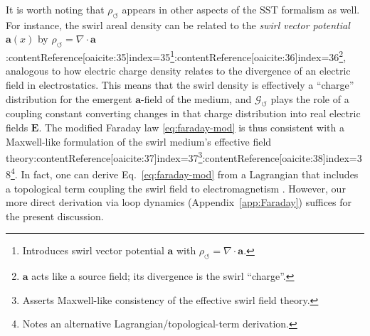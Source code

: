 \documentclass[12pt]{article}
\begin{document}
        It is worth noting that $\rho_{\!\boldsymbol{\circlearrowleft}}$ appears in other aspects of the SST formalism as well. For instance, the swirl areal density can be related to the \emph{swirl vector potential} $\mathbf{a}(x)$ by $\rho_{\!\boldsymbol{\circlearrowleft}} = \nabla \cdot \mathbf{a}$:contentReference[oaicite:35]{index=35}\footnote{Introduces swirl vector potential $\mathbf a$ with $\rho_{\!\circlearrowleft}=\nabla\!\cdot\!\mathbf a$.}:contentReference[oaicite:36]{index=36}\footnote{$\mathbf a$ acts like a source field; its divergence is the swirl ``charge''.}, analogous to how electric charge density relates to the divergence of an electric field in electrostatics. This means that the swirl density is effectively a ``charge'' distribution for the emergent $\mathbf{a}$-field of the medium, and $\mathcal{G}_{\!\boldsymbol{\circlearrowleft}}$ plays the role of a coupling constant converting changes in that charge distribution into real electric fields $\mathbf{E}$. The modified Faraday law \eqref{eq:faraday-mod} is thus consistent with a Maxwell-like formulation of the swirl medium’s effective field theory:contentReference[oaicite:37]{index=37}\footnote{Asserts Maxwell-like consistency of the effective swirl field theory.}:contentReference[oaicite:38]{index=38}\footnote{Notes an alternative Lagrangian/topological-term derivation.}. In fact, one can derive Eq.~\eqref{eq:faraday-mod} from a Lagrangian that includes a topological term coupling the swirl field to electromagnetism \cite{Iskandarani2025RotatingFrame}. However, our more direct derivation via loop dynamics (Appendix~\ref{app:Faraday}) suffices for the present discussion.
\end{document}
